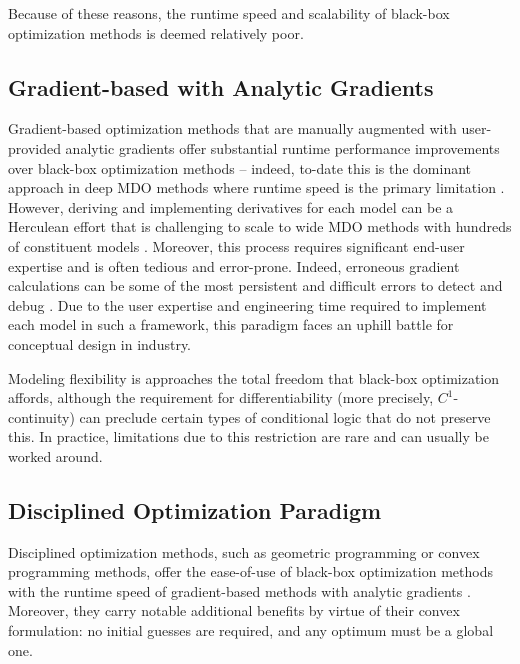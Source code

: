 \documentclass[12pt,vi,oneside]{report}
\begin{document}
\begin{appendices}
        Because of these reasons, the runtime speed and scalability of black-box optimization methods is deemed relatively poor.

        \subsection*{Gradient-based with Analytic Gradients}

        Gradient-based optimization methods that are manually augmented with user-provided analytic gradients offer substantial runtime performance improvements over black-box optimization methods -- indeed, to-date this is the dominant approach in deep MDO methods where runtime speed is the primary limitation \cite{martins_coupledadjoint_2005}. However, deriving and implementing derivatives for each model can be a Herculean effort that is challenging to scale to wide MDO methods with hundreds of constituent models \cite{brelje_multidisciplinary_2021}. Moreover, this process requires significant end-user expertise and is often tedious and error-prone. Indeed, erroneous gradient calculations can be some of the most persistent and difficult errors to detect and debug \cite{martins_engineering_2021}. Due to the user expertise and engineering time required to implement each model in such a framework, this paradigm faces an uphill battle for conceptual design in industry.

        Modeling flexibility is approaches the total freedom that black-box optimization affords, although the requirement for differentiability (more precisely, $C^1$-continuity) can preclude certain types of conditional logic that do not preserve this. In practice, limitations due to this restriction are rare and can usually be worked around.

        \subsection*{Disciplined Optimization Paradigm}

        Disciplined optimization methods, such as geometric programming or convex programming methods, offer the ease-of-use of black-box optimization methods with the runtime speed of gradient-based methods with analytic gradients \cite{gpkit, kirschen}. Moreover, they carry notable additional benefits by virtue of their convex formulation: no initial guesses are required, and any optimum must be a global one.


\end{appendices}
\end{document}
